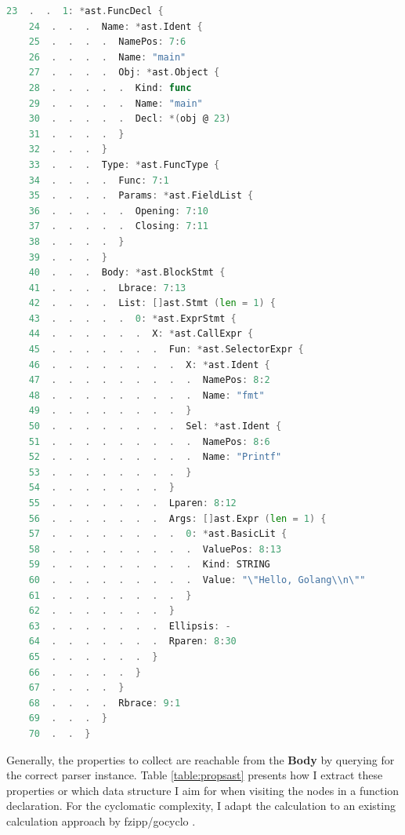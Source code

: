 \documentclass{seal_thesis}
\begin{document}
\begin{minipage}{\linewidth}
\begin{lstlisting}[caption=Sample output from yuroyoro's Ast Viewer \cite{goastviewer}., label={yuroyoro}, language=Go, frame=single, ]
	23  .  .  1: *ast.FuncDecl {
	24  .  .  .  Name: *ast.Ident {
	25  .  .  .  .  NamePos: 7:6
	26  .  .  .  .  Name: "main"
	27  .  .  .  .  Obj: *ast.Object {
	28  .  .  .  .  .  Kind: func
	29  .  .  .  .  .  Name: "main"
	30  .  .  .  .  .  Decl: *(obj @ 23)
	31  .  .  .  .  }
	32  .  .  .  }
	33  .  .  .  Type: *ast.FuncType {
	34  .  .  .  .  Func: 7:1
	35  .  .  .  .  Params: *ast.FieldList {
	36  .  .  .  .  .  Opening: 7:10
	37  .  .  .  .  .  Closing: 7:11
	38  .  .  .  .  }
	39  .  .  .  }
	40  .  .  .  Body: *ast.BlockStmt {
	41  .  .  .  .  Lbrace: 7:13
	42  .  .  .  .  List: []ast.Stmt (len = 1) {
	43  .  .  .  .  .  0: *ast.ExprStmt {
	44  .  .  .  .  .  .  X: *ast.CallExpr {
	45  .  .  .  .  .  .  .  Fun: *ast.SelectorExpr {
	46  .  .  .  .  .  .  .  .  X: *ast.Ident {
	47  .  .  .  .  .  .  .  .  .  NamePos: 8:2
	48  .  .  .  .  .  .  .  .  .  Name: "fmt"
	49  .  .  .  .  .  .  .  .  }
	50  .  .  .  .  .  .  .  .  Sel: *ast.Ident {
	51  .  .  .  .  .  .  .  .  .  NamePos: 8:6
	52  .  .  .  .  .  .  .  .  .  Name: "Printf"
	53  .  .  .  .  .  .  .  .  }
	54  .  .  .  .  .  .  .  }
	55  .  .  .  .  .  .  .  Lparen: 8:12
	56  .  .  .  .  .  .  .  Args: []ast.Expr (len = 1) {
	57  .  .  .  .  .  .  .  .  0: *ast.BasicLit {
	58  .  .  .  .  .  .  .  .  .  ValuePos: 8:13
	59  .  .  .  .  .  .  .  .  .  Kind: STRING
	60  .  .  .  .  .  .  .  .  .  Value: "\"Hello, Golang\\n\""
	61  .  .  .  .  .  .  .  .  }
	62  .  .  .  .  .  .  .  }
	63  .  .  .  .  .  .  .  Ellipsis: -
	64  .  .  .  .  .  .  .  Rparen: 8:30
	65  .  .  .  .  .  .  }
	66  .  .  .  .  .  }
	67  .  .  .  .  }
	68  .  .  .  .  Rbrace: 9:1
	69  .  .  .  }
	70  .  .  }
\end{lstlisting}
\end{minipage}

\noindent Generally, the properties to collect are reachable from the \textbf{Body} by querying for the correct parser instance. Table \ref{table:propsast} presents how I extract these properties or which data structure I aim for when visiting the nodes in a function declaration. For the cyclomatic complexity, I adapt the calculation to an existing calculation approach by fzipp/gocyclo \cite{gocyclo}. 
\end{document}
